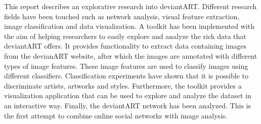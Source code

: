This report describes an explorative research into deviantART. Different research fields have been touched such as network analysis, visual feature extraction, image classification and data visualization.
A toolkit has been implemented with the aim of helping researchers to easily explore and analyze the rich data that deviantART offers. It provides functionality to extract data containing images from the devianART website, after which the images are annotated with different types of image features. These image features are used to classify images using different classifiers. Classification experiments have shown that it is possible to discriminate artists, artworks and styles. Furthermore, the toolkit provides a visualization application that can be used to explore and analyze the dataset in an interactive way. Finally, the deviantART network has been analyzed. This is the first attempt to combine online social networks with image analysis.

